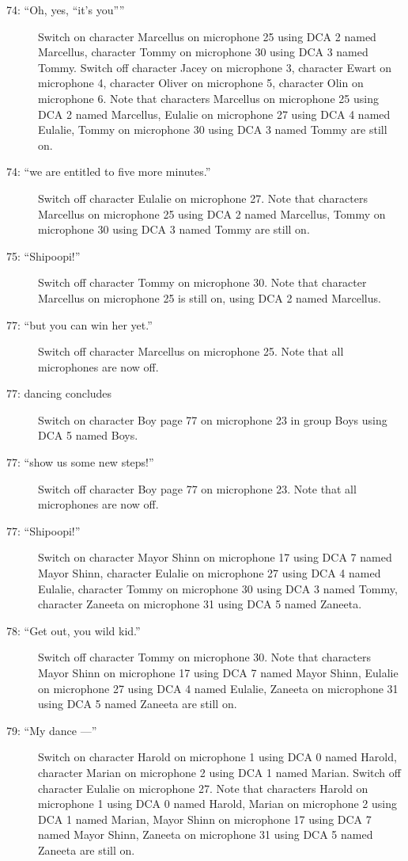\begin{description}
\item[74: ``Oh, yes, ``it's you'''']
Switch on character Marcellus on microphone 25 using DCA 2 named Marcellus, character Tommy on microphone 30 using DCA 3 named Tommy. Switch off character Jacey on microphone 3, character Ewart on microphone 4, character Oliver on microphone 5, character Olin on microphone 6. Note that characters Marcellus on microphone 25 using DCA 2 named Marcellus, Eulalie on microphone 27 using DCA 4 named Eulalie, Tommy on microphone 30 using DCA 3 named Tommy are still on.  

\item[74: ``we are entitled to five more minutes.'']
Switch off character Eulalie on microphone 27. Note that characters Marcellus on microphone 25 using DCA 2 named Marcellus, Tommy on microphone 30 using DCA 3 named Tommy are still on.  

\item[75: ``Shipoopi!'']
Switch off character Tommy on microphone 30. Note that character Marcellus on microphone 25 is still on, using DCA 2 named Marcellus.

\item[77: ``but you can win her yet.'']
Switch off character Marcellus on microphone 25. Note that all microphones are now off.

\item[77: dancing concludes]
Switch on character Boy page 77 on microphone 23 in group Boys using DCA 5 named Boys. 

\item[77: ``show us some new steps!'']
Switch off character Boy page 77 on microphone 23. Note that all microphones are now off.

\item[77: ``Shipoopi!'']
Switch on character Mayor Shinn on microphone 17 using DCA 7 named Mayor Shinn, character Eulalie on microphone 27 using DCA 4 named Eulalie, character Tommy on microphone 30 using DCA 3 named Tommy, character Zaneeta on microphone 31 using DCA 5 named Zaneeta. 

\item[78: ``Get out, you wild kid.'']
Switch off character Tommy on microphone 30. Note that characters Mayor Shinn on microphone 17 using DCA 7 named Mayor Shinn, Eulalie on microphone 27 using DCA 4 named Eulalie, Zaneeta on microphone 31 using DCA 5 named Zaneeta are still on.  

\item[79: ``My dance ---'']
Switch on character Harold on microphone 1 using DCA 0 named Harold, character Marian on microphone 2 using DCA 1 named Marian. Switch off character Eulalie on microphone 27. Note that characters Harold on microphone 1 using DCA 0 named Harold, Marian on microphone 2 using DCA 1 named Marian, Mayor Shinn on microphone 17 using DCA 7 named Mayor Shinn, Zaneeta on microphone 31 using DCA 5 named Zaneeta are still on.  


\end{description}
